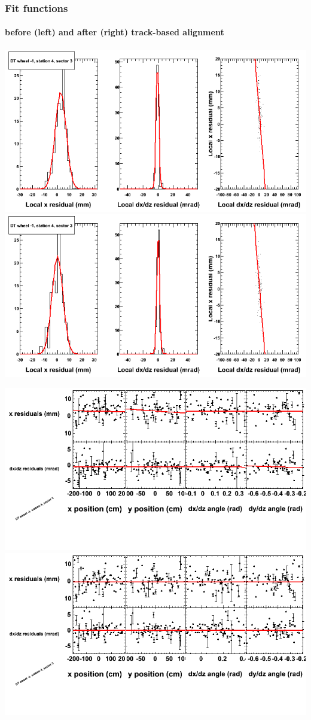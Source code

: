 \documentclass[compress]{beamer}
\begin{document}
\begin{frame}
\frametitle{Fit functions}
\framesubtitle{before (left) and after (right) track-based alignment}
\includegraphics[width=0.5\linewidth]{fitfunctions_re01/MBwhBst4sec03_bellcurves.png} \includegraphics[width=0.5\linewidth]{fitfunctions_re05/MBwhBst4sec03_bellcurves.png}

\includegraphics[width=0.5\linewidth]{fitfunctions_re01/MBwhBst4sec03_polynomials.png} \includegraphics[width=0.5\linewidth]{fitfunctions_re05/MBwhBst4sec03_polynomials.png}
\end{frame}
\end{document}
